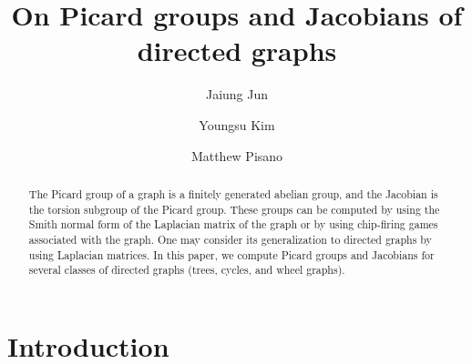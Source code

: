 \documentclass[11pt,reqno]{amsart}
\theoremstyle{definition}
\theoremstyle{plain}
\begin{document}
\title{On Picard groups and Jacobians of directed graphs}

\author{Jaiung Jun}
\address{Department of Mathematics, State University of New York at New Paltz, NY 12561, USA}

\author{Youngsu Kim}
\address{Department of Mathematics, California State University San Bernardino, San Bernardino, CA 92407}

\author{Matthew Pisano}
\address{Department of Computer Science, State University of New York at New Paltz, NY 12561, USA}

\makeatletter
{}
\makeatother


\maketitle

\begin{abstract}
The Picard group of a graph is a finitely generated abelian group, and the Jacobian is the torsion subgroup of the Picard group. 
These groups can be computed by using the Smith normal form of the Laplacian matrix of the graph or by using chip-firing games associated with the graph. 
One may consider its generalization to directed graphs by using Laplacian matrices. 
In this paper, we compute Picard groups and Jacobians for several classes of directed graphs (trees, cycles, and wheel graphs). 
\end{abstract}

\section{Introduction}

\end{document}
